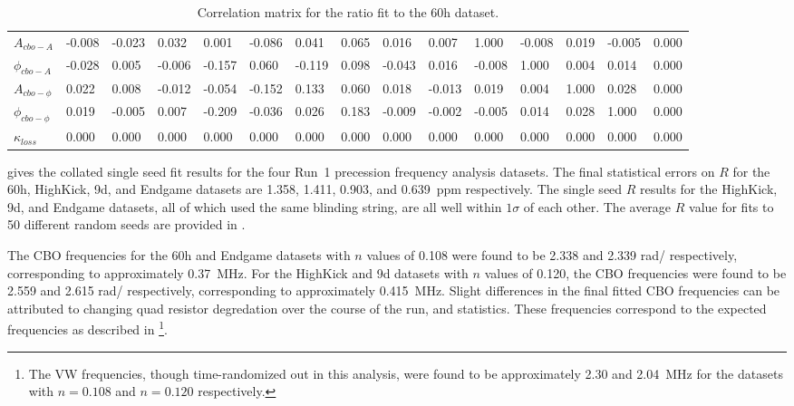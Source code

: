 \begin{landscape}
\begin{table}[]
\begin{tabular*}{\linewidth}{@{\extracolsep{\fill}}lLBLLLLLLLLLLLL}
$A_{cbo-A}$        & -0.008 & -0.023 & 0.032 & 0.001 & -0.086 & 0.041 & 0.065 & 0.016 & 0.007 & 1.000 & -0.008 & 0.019 & -0.005 & 0.000  \\
$\phi_{cbo-A}$     & -0.028 & 0.005 & -0.006 & -0.157 & 0.060 & -0.119 & 0.098 & -0.043 & 0.016 & -0.008 & 1.000 & 0.004 & 0.014 & 0.000  \\
$A_{cbo-\phi}$     & 0.022 & 0.008 & -0.012 & -0.054 & -0.152 & 0.133 & 0.060 & 0.018 & -0.013 & 0.019 & 0.004 & 1.000 & 0.028 & 0.000  \\
$\phi_{cbo-\phi}$  & 0.019 & -0.005 & 0.007 & -0.209 & -0.036 & 0.026 & 0.183 & -0.009 & -0.002 & -0.005 & 0.014 & 0.028 & 1.000 & 0.000  \\
$\kappa_{loss}$    & 0.000 & 0.000 & 0.000 & 0.000 & 0.000 & 0.000 & 0.000 & 0.000 & 0.000 & 0.000 & 0.000 & 0.000 & 0.000 & 0.000  \\
  \bottomrule
\end{tabular*}
\caption[60h ratio fit correlation matrix]{Correlation matrix for the ratio fit to the 60h dataset.}
\label{Tab:CorrMat_60h}
\end{table}
\end{landscape}



 gives the collated single seed fit results for the four Run~1 precession frequency analysis datasets. The final statistical errors on $R$ for the 60h, HighKick, 9d, and Endgame datasets are \SI{1.358}{}, \SI{1.411}{}, \SI{0.903}{}, and \SI{0.639}{ppm} respectively. The single seed $R$ results for the HighKick, 9d, and Endgame datasets, all of which used the same blinding string, are all well within $1\sigma$ of each other. The average $R$ value for fits to 50 different random seeds are provided in .


The CBO frequencies for the 60h and Endgame datasets with $n$ values of 0.108 were found to be 2.338 and 2.339 rad/\mus{} respectively, corresponding to approximately \SI{0.37}{MHz}. For the HighKick and 9d datasets with $n$ values of 0.120, the CBO frequencies were found to be 2.559 and 2.615 rad/\mus{} respectively, corresponding to approximately \SI{0.415}{MHz}. Slight differences in the final fitted CBO frequencies can be attributed to changing quad resistor degredation over the course of the run, and statistics. These frequencies correspond to the expected frequencies as described in \footnote{The VW frequencies, though time-randomized out in this analysis, were found to be approximately \SI{2.30}{} and \SI{2.04}{MHz} for the datasets with $n=0.108$ and $n=0.120$ respectively.}.


